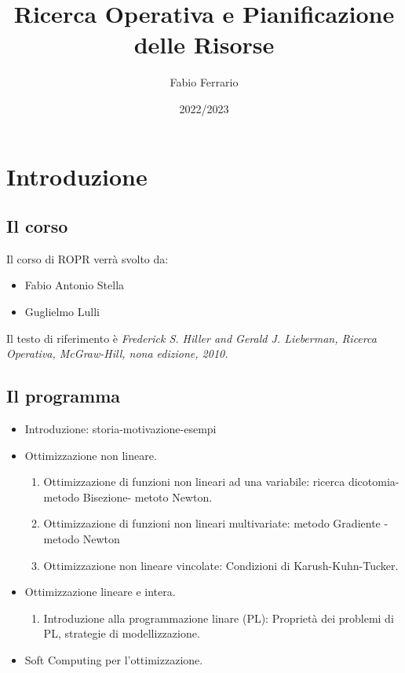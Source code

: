 \documentclass[12pt, a4paper, openany]{book}
\begin{document}
\title{Ricerca Operativa e Pianificazione delle Risorse}
\author{Fabio Ferrario}
\date{2022/2023}
\maketitle

\tableofcontents

\chapter{Introduzione}

\section{Il corso}
Il corso di ROPR verrà svolto da:
\begin{itemize}
    \item Fabio Antonio Stella
    \item Guglielmo Lulli
\end{itemize}

Il testo di riferimento è \emph{Frederick S. Hiller and Gerald J. Lieberman, Ricerca Operativa, McGraw-Hill, nona edizione, 2010.}


\section{Il programma}

\begin{itemize}
    \item Introduzione: storia-motivazione-esempi

    \item Ottimizzazione non lineare.
          \begin{enumerate}
              \item Ottimizzazione di funzioni non lineari ad una variabile: ricerca dicotomia-metodo Bisezione- metoto Newton.
              \item Ottimizzazione di funzioni non lineari multivariate: metodo Gradiente - metodo Newton
              \item Ottimizzazione non lineare vincolate: Condizioni di Karush-Kuhn-Tucker.
          \end{enumerate}
    \item Ottimizzazione lineare e intera.
          \begin{enumerate}
              \item Introduzione alla programmazione linare (PL): Proprietà dei problemi di PL, strategie di modellizzazione.
          \end{enumerate}
    \item Soft Computing per l'ottimizzazione.
\end{itemize}
\end{document}
